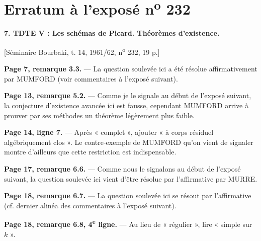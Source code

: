 \clearpage
\chapter*{Erratum à l'exposé n\textsuperscript{o} 232}

\noindent\textbf{7. TDTE V : Les schémas de Picard. Théorèmes d'existence.}

\begin{center}
[Séminaire Bourbaki, t. 14, 1961/62, n\textsuperscript{o} 232, 19 p.]
\end{center}

\noindent\textbf{Page 7, remarque 3.3.} --- La question soulevée ici a été
résolue affirmativement par MUMFORD (voir commentaires à l'exposé suivant).

\noindent\textbf{Page 13, remarque 5.2.} --- Comme je le signale au début de
l'exposé suivant, la conjecture d'existence avancée ici est fausse, cependant
MUMFORD arrive à prouver par ses méthodes un théorème légèrement plus faible.

\noindent\textbf{Page 14, ligne 7.} --- Après « complet », ajouter « à corps
résiduel algébriquement clos ». Le contre-exemple de MUMFORD qu'on vient de
signaler montre d'ailleurs que cette restriction est indispensable.

\noindent\textbf{Page 17, remarque 6.6.} --- Comme nous le signalons au début
de l'exposé suivant, la question soulevée ici vient d'être résolue par
l'affirmative par MURRE.

\noindent\textbf{Page 18, remarque 6.7.} --- La question soulevée ici se résout
par l'affirmative (cf. dernier alinéa des commentaires à l'exposé suivant).

\noindent\textbf{Page 18, remarque 6.8, 4\textsuperscript{e} ligne.} --- Au lieu
de « régulier », lire « simple sur $k$ ».

\par\smallskip
\begingroup\footnotesize
\endgroup
